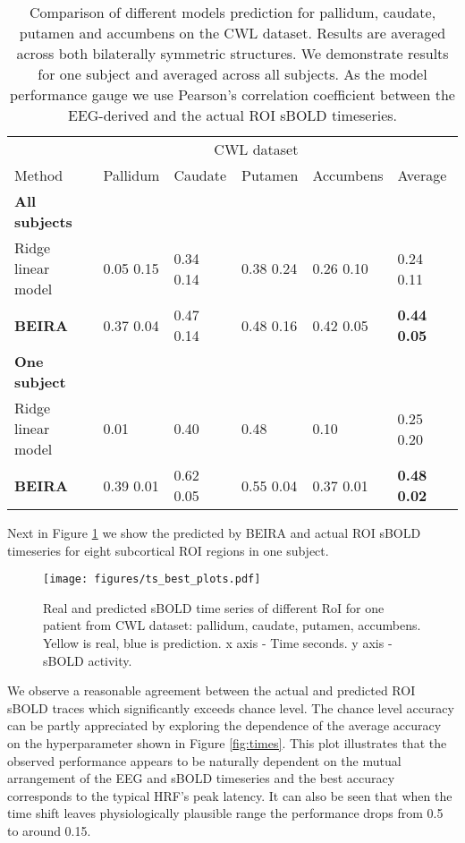 \documentclass{article}
\begin{document}
\begin{table}[ht]
  \caption{ \label{table:results} Comparison of different models prediction for pallidum, caudate, putamen and accumbens on the CWL dataset. Results are averaged across both bilaterally symmetric structures. We demonstrate results for one subject and  averaged across all subjects. As the model performance gauge we use Pearson's correlation coefficient between the EEG-derived and the actual ROI sBOLD timeseries. 
  }
  \label{sample-table}
  \centering
  \begin{tabular}{llllll}
    \toprule
    \multicolumn{4}{r}{CWL dataset}\\                  
    \cmidrule(r){2-5}
    Method & Pallidum & Caudate & Putamen & Accumbens & Average \\
    \midrule
    \midrule
    \textbf{All subjects} & & & & & \\
    Ridge linear model     & 0.05  0.15 & 0.34  0.14 & 0.38  0.24 & 0.26  0.10 &  0.24  0.11 \\
\midrule
    \textbf{BEIRA} & 0.37  0.04 & 0.47  0.14 & 0.48  0.16 & 0.42  0.05 &\textbf{0.44  0.05}\\
    \midrule
    \midrule
    \textbf{One subject} & & & & & \\
    Ridge linear model     &0.01  & 0.40 & 0.48 & 0.10& 0.25 0.20\\
    \midrule
    \textbf{BEIRA}    & 0.39  0.01  & 0.62  0.05& 0.55  0.04 &0.37  0.01 & \textbf{0.48  0.02} \\
    \bottomrule
  \end{tabular}
\end{table}

Next in Figure \ref{fig:ts_plot} we show the predicted by BEIRA and actual ROI sBOLD timeseries for eight subcortical ROI regions in one subject. 

\begin{figure}[ht]
    \centering
    \texttt{[image: figures/ts\_best\_plots.pdf]}
    \caption{\label{fig:ts_plot} Real and predicted sBOLD time series of different RoI for one patient from CWL dataset: pallidum, caudate, putamen, accumbens. Yellow is real, blue is prediction. x axis - Time seconds. y axis - sBOLD activity.
     }
\end{figure}

We observe a reasonable agreement between the actual and predicted ROI sBOLD traces which significantly exceeds chance level. The chance level accuracy can be partly appreciated by exploring the dependence of the average accuracy on the  hyperparameter shown in Figure \ref{fig:times}. This plot illustrates that the observed performance appears to be naturally dependent on the mutual arrangement of the EEG and sBOLD timeseries and the best accuracy corresponds to the typical HRF's peak latency. It can also be seen that when the time shift leaves physiologically plausible range the performance drops from 0.5 to around 0.15.        
\end{document}
